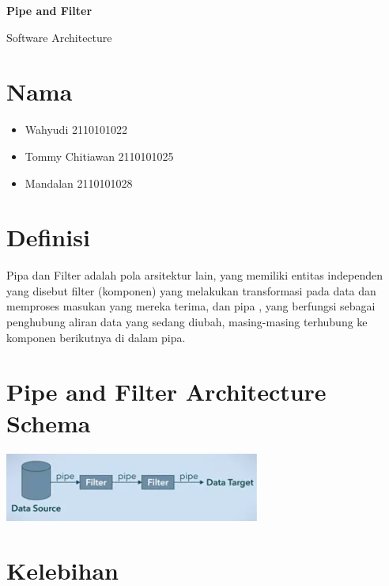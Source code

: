 \documentclass{article}
\begin{document}
	\begin{titlepage}
		\begin{center}
			\textbf{\huge Pipe and Filter}
			
			\vspace{0.5cm}
			
			{\large Software Architecture}
			
			\vspace{2.5cm}
			
			\section*{Nama}
			\begin{varwidth}{\textwidth}
				\begin{itemize}
					\item Wahyudi 2110101022
					\item Tommy Chitiawan 2110101025
					\item Mandalan 2110101028
				\end{itemize}
			\end{varwidth}
			
			
			
		\end{center}
		
	\end{titlepage}
	\section{Definisi}
	Pipa dan Filter adalah pola arsitektur lain, yang memiliki entitas independen yang disebut filter (komponen) yang melakukan transformasi pada data dan memproses masukan yang mereka terima, dan pipa , yang berfungsi sebagai penghubung aliran data yang sedang diubah, masing-masing terhubung ke komponen berikutnya di dalam pipa.
	
	\section{Pipe and Filter Architecture Schema
	}
	\includegraphics{Capture.png}
	
	\section{Kelebihan}
	
\end{document}
